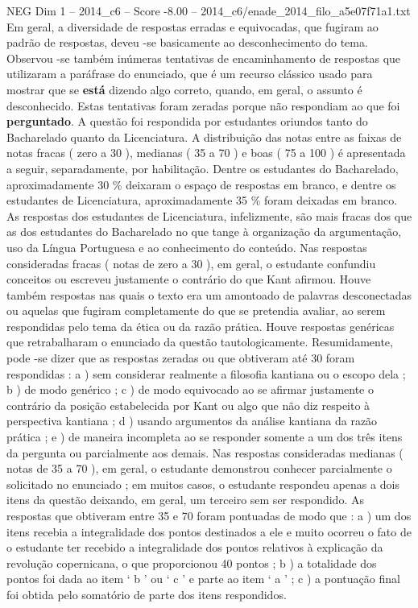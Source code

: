 \begin{textsample}{NEG Dim 1 – 2014\_c6 – Score -8.00 – 2014\_c6/enade\_2014\_filo\_a5e07f71a1.txt}
Em geral, a diversidade de respostas erradas e equivocadas, que fugiram ao padrão de respostas, deveu -se basicamente ao desconhecimento do tema.
Observou -se também inúmeras tentativas de encaminhamento de respostas que utilizaram a paráfrase do enunciado, que é um recurso clássico usado para mostrar que se \textbf{está} dizendo algo correto, quando, em geral, o assunto é desconhecido.
Estas tentativas foram zeradas porque não respondiam ao que foi \textbf{perguntado}.
A questão foi respondida por estudantes oriundos tanto do Bacharelado quanto da Licenciatura.
A distribuição das notas entre as faixas de notas fracas ( zero a 30 ), medianas ( 35 a 70 ) e boas ( 75 a 100 ) é apresentada a seguir, separadamente, por habilitação.
Dentre os estudantes do Bacharelado, aproximadamente 30 \% deixaram o espaço de respostas em branco, e dentre os estudantes de Licenciatura, aproximadamente 35 \% foram deixadas em branco.
As respostas dos estudantes de Licenciatura, infelizmente, são mais fracas dos que as dos estudantes do Bacharelado no que tange à organização da argumentação, uso da Língua Portuguesa e ao conhecimento do conteúdo.
Nas respostas consideradas fracas ( notas de zero a 30 ), em geral, o estudante confundiu conceitos ou escreveu justamente o contrário do que Kant afirmou.
Houve também respostas nas quais o texto era um amontoado de palavras desconectadas ou aquelas que fugiram completamente do que se pretendia avaliar, ao serem respondidas pelo tema da ética ou da razão prática.
Houve respostas genéricas que retrabalharam o enunciado da questão tautologicamente.
Resumidamente, pode -se dizer que as respostas zeradas ou que obtiveram até 30 foram respondidas : a ) sem considerar realmente a filosofia kantiana ou o escopo dela ; b ) de modo genérico ; c ) de modo equivocado ao se afirmar justamente o contrário da posição estabelecida por Kant ou algo que não diz respeito à perspectiva kantiana ; d ) usando argumentos da análise kantiana da razão prática ; e ) de maneira incompleta ao se responder somente a um dos três itens da pergunta ou parcialmente aos demais.
Nas respostas consideradas medianas ( notas de 35 a 70 ), em geral, o estudante demonstrou conhecer parcialmente o solicitado no enunciado ; em muitos casos, o estudante respondeu apenas a dois itens da questão deixando, em geral, um terceiro sem ser respondido.
As respostas que obtiveram entre 35 e 70 foram pontuadas de modo que : a ) um dos itens recebia a integralidade dos pontos destinados a ele e muito ocorreu o fato de o estudante ter recebido a integralidade dos pontos relativos à explicação da revolução copernicana, o que proporcionou 40 pontos ; b ) a totalidade dos pontos foi dada ao item ‘ b ’ ou ‘ c ’ e parte ao item ‘ a ’ ; c ) a pontuação final foi obtida pelo somatório de parte dos itens respondidos.

\end{textsample}
